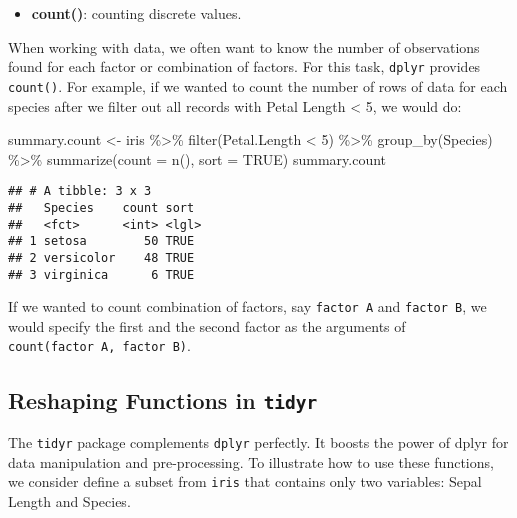 \documentclass[
]{article}
\newenvironment{Shaded}{\begin{snugshade}}{\end{snugshade}}
\newcommand{\AttributeTok}[1]{\textcolor[rgb]{0.77,0.63,0.00}{#1}}
\newcommand{\ConstantTok}[1]{\textcolor[rgb]{0.00,0.00,0.00}{#1}}
\newcommand{\DecValTok}[1]{\textcolor[rgb]{0.00,0.00,0.81}{#1}}
\newcommand{\FunctionTok}[1]{\textcolor[rgb]{0.00,0.00,0.00}{#1}}
\newcommand{\NormalTok}[1]{#1}
\newcommand{\OtherTok}[1]{\textcolor[rgb]{0.56,0.35,0.01}{#1}}
\newcommand{\SpecialCharTok}[1]{\textcolor[rgb]{0.00,0.00,0.00}{#1}}
\providecommand{\tightlist}{%
  \setlength{\itemsep}{0pt}\setlength{\parskip}{0pt}}
\begin{document}
\begin{itemize}
\tightlist
\item
  \textbf{count()}: counting discrete values.
\end{itemize}

When working with data, we often want to know the number of observations
found for each factor or combination of factors. For this task,
\texttt{dplyr} provides \texttt{count()}. For example, if we wanted to
count the number of rows of data for each species after we filter out
all records with Petal Length \textless{} 5, we would do:

\begin{Shaded}
\begin{Highlighting}[]
\NormalTok{summary.count }\OtherTok{\textless{}{-}}\NormalTok{ iris }\SpecialCharTok{\%\textgreater{}\%}
             \FunctionTok{filter}\NormalTok{(Petal.Length }\SpecialCharTok{\textless{}} \DecValTok{5}\NormalTok{) }\SpecialCharTok{\%\textgreater{}\%}
             \FunctionTok{group\_by}\NormalTok{(Species) }\SpecialCharTok{\%\textgreater{}\%}
             \FunctionTok{summarize}\NormalTok{(}\AttributeTok{count =} \FunctionTok{n}\NormalTok{(), }\AttributeTok{sort =} \ConstantTok{TRUE}\NormalTok{) }
\NormalTok{summary.count}
\end{Highlighting}
\end{Shaded}

\begin{verbatim}
## # A tibble: 3 x 3
##   Species    count sort 
##   <fct>      <int> <lgl>
## 1 setosa        50 TRUE 
## 2 versicolor    48 TRUE 
## 3 virginica      6 TRUE
\end{verbatim}

If we wanted to count combination of factors, say \texttt{factor\ A} and
\texttt{factor\ B}, we would specify the first and the second factor as
the arguments of \texttt{count(factor\ A,\ factor\ B)}.

\hypertarget{reshaping-functions-in-tidyr}{%
\subsection{\texorpdfstring{Reshaping Functions in
\texttt{tidyr}}{Reshaping Functions in tidyr}}\label{reshaping-functions-in-tidyr}}

The \texttt{tidyr} package complements \texttt{dplyr} perfectly. It
boosts the power of dplyr for data manipulation and pre-processing. To
illustrate how to use these functions, we consider define a subset from
\texttt{iris} that contains only two variables: Sepal Length and
Species.
\end{document}
